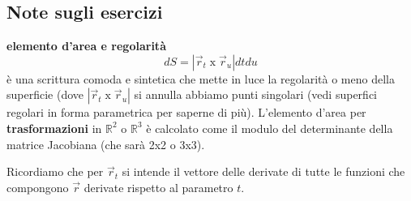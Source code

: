 \subsection{Note sugli esercizi}
\begin{tcolorbox}
\textbf{elemento d'area e regolarità}
\[
    dS = |\vec{r}_t \; \text{x}\; \vec{r}_u| dt du
\]
è una scrittura comoda e sintetica che mette in luce la regolarità o meno della superficie (dove $|\vec{r}_t \; \text{x}\; \vec{r}_u|$ si annulla abbiamo punti singolari (vedi superfici regolari in forma parametrica per saperne di più).\newline
\newline
L'elemento d'area per \textbf{trasformazioni} in $\mathbb{R}^2$ o $\mathbb{R}^3$ è calcolato come il modulo del determinante della matrice Jacobiana (che sarà 2x2 o 3x3).
\end{tcolorbox}
Ricordiamo che per $\vec{r}_t$ si intende il vettore delle derivate di tutte le funzioni che compongono $\vec{r}$ derivate rispetto al parametro $t$.\newline
